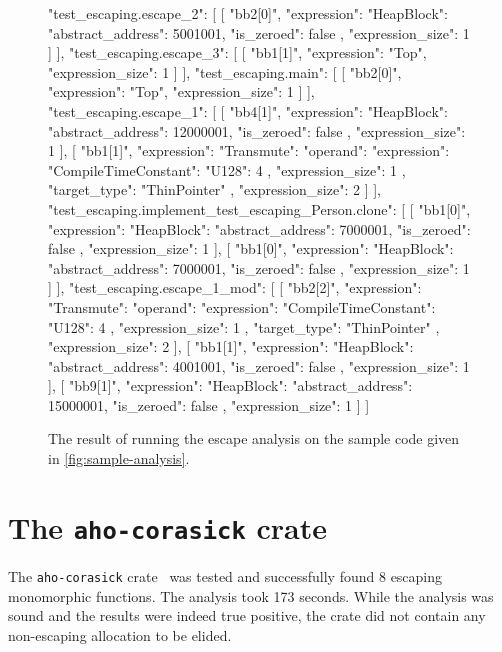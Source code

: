 \documentclass[en]{snu-ece-bsc-thesis}
\theoremstyle{definition}
\begin{document}
\begin{figure}[htbp]
\begin{jsoncode}
{ "test_escaping.escape_2": [
    [ "bb2[0]",
      { "expression": { "HeapBlock": { "abstract_address": 5001001, "is_zeroed": false } },
        "expression_size": 1 } ] ],
  "test_escaping.escape_3": [
    [ "bb1[1]",
      { "expression": "Top",
        "expression_size": 1 } ] ],
  "test_escaping.main": [
    [ "bb2[0]",
      { "expression": "Top",
        "expression_size": 1 } ] ],
  "test_escaping.escape_1": [
    [ "bb4[1]",
      { "expression": { "HeapBlock": { "abstract_address": 12000001, "is_zeroed": false } },
        "expression_size": 1 } ],
    [ "bb1[1]",
      { "expression": { "Transmute": { "operand": { "expression": { "CompileTimeConstant": { "U128": 4 } }, "expression_size": 1 }, "target_type": "ThinPointer" } },
        "expression_size": 2 } ] ],
  "test_escaping.implement_test_escaping_Person.clone": [
    [ "bb1[0]",
      { "expression": { "HeapBlock": { "abstract_address": 7000001, "is_zeroed": false } },
        "expression_size": 1 } ],
    [ "bb1[0]",
      { "expression": { "HeapBlock": { "abstract_address": 7000001, "is_zeroed": false } },
        "expression_size": 1 } ] ],
  "test_escaping.escape_1_mod": [
    [ "bb2[2]",
      { "expression": { "Transmute": { "operand": { "expression": { "CompileTimeConstant": { "U128": 4 } }, "expression_size": 1 }, "target_type": "ThinPointer" } },
        "expression_size": 2 } ],
    [ "bb1[1]",
      { "expression": { "HeapBlock": { "abstract_address": 4001001, "is_zeroed": false } },
        "expression_size": 1 } ],
    [ "bb9[1]",
      { "expression": { "HeapBlock": { "abstract_address": 15000001, "is_zeroed": false } },
        "expression_size": 1 } ] ] }
\end{jsoncode}
\caption{The result of running the escape analysis on the sample code given in \autoref{fig:sample-analysis}.}\label{fig:sample-result}
\end{figure}

\section{The \texttt{aho-corasick} crate}
The \verb/aho-corasick/ crate~\cite{aho-corasick} was tested and successfully found 8 escaping monomorphic functions.
The analysis took 173 seconds.
While the analysis was sound and the results were indeed true positive, the crate did not contain any non-escaping allocation to be elided.
\end{document}
